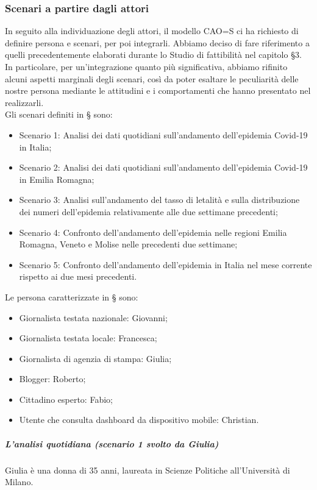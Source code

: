 \noindent
\subsubsection{Scenari a partire dagli attori}
\label{sss:scenari-a-partire-da-attori}
In seguito alla individuazione degli attori, il modello CAO=S ci ha richiesto di definire persona e scenari, per poi integrarli.
Abbiamo deciso di fare riferimento a quelli precedentemente elaborati durante lo Studio di fattibilità nel capitolo §3.
In particolare, per un'integrazione quanto più significativa, abbiamo rifinito alcuni aspetti marginali degli scenari, così da poter esaltare le peculiarità delle nostre persona mediante le attitudini e i comportamenti che hanno presentato nel realizzarli.\\
Gli scenari definiti in § sono:
\begin{itemize}
    \item Scenario 1: Analisi dei dati quotidiani sull'andamento dell'epidemia Covid-19 in Italia;
    \item Scenario 2: Analisi dei dati quotidiani sull'andamento dell'epidemia Covid-19 in Emilia Romagna;
    \item Scenario 3: Analisi sull'andamento del tasso di letalità e sulla distribuzione dei numeri dell'epidemia relativamente alle due settimane precedenti;
    \item Scenario 4: Confronto dell'andamento dell'epidemia nelle regioni Emilia Romagna, Veneto e Molise nelle precedenti due settimane;
    \item Scenario 5: Confronto dell'andamento dell'epidemia in Italia nel mese corrente rispetto ai due mesi precedenti.
\end{itemize}
Le persona caratterizzate in § sono:
\begin{itemize}
    \item Giornalista testata nazionale: Giovanni;
    \item Giornalista testata locale: Francesca;
    \item Giornalista di agenzia di stampa: Giulia;
    \item Blogger: Roberto;
    \item Cittadino esperto: Fabio;
    \item Utente che consulta dashboard da dispositivo mobile: Christian.
\end{itemize}
\noindent
\subparagraph{L'analisi quotidiana (scenario 1 svolto da Giulia)}
Giulia è una donna di 35 anni, laureata in Scienze Politiche all'Università di Milano.
